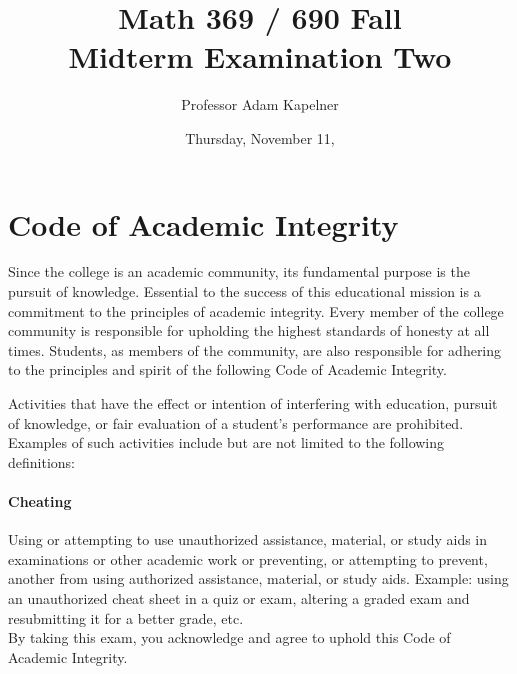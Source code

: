 \documentclass[12pt,landscape]{article}
\title{Math 369 / 690 Fall \the\year{} \\ Midterm Examination Two}
\author{Professor Adam Kapelner}
\date{Thursday, November 11, \the\year{}}
\begin{document}
\maketitle


\thispagestyle{empty}

\section*{Code of Academic Integrity}

\footnotesize
Since the college is an academic community, its fundamental purpose is the pursuit of knowledge. Essential to the success of this educational mission is a commitment to the principles of academic integrity. Every member of the college community is responsible for upholding the highest standards of honesty at all times. Students, as members of the community, are also responsible for adhering to the principles and spirit of the following Code of Academic Integrity.

Activities that have the effect or intention of interfering with education, pursuit of knowledge, or fair evaluation of a student's performance are prohibited. Examples of such activities include but are not limited to the following definitions:

\paragraph{Cheating} Using or attempting to use unauthorized assistance, material, or study aids in examinations or other academic work or preventing, or attempting to prevent, another from using authorized assistance, material, or study aids. Example: using an unauthorized cheat sheet in a quiz or exam, altering a graded exam and resubmitting it for a better grade, etc.
\\

\noindent By taking this exam, you acknowledge and agree to uphold this Code of Academic Integrity. \\


\normalsize
\vspace{-0.3cm}
\end{document}
